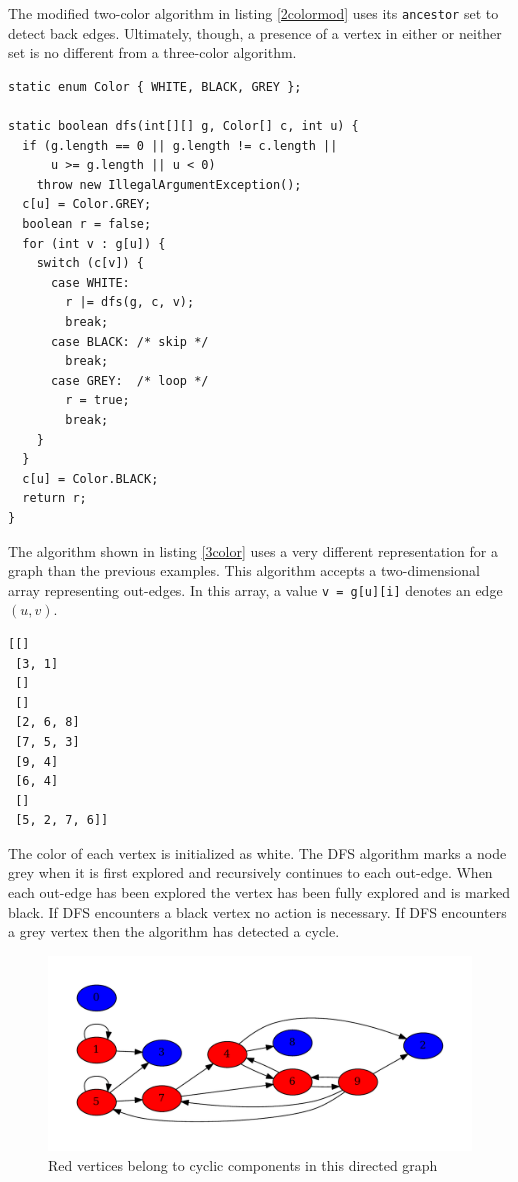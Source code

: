 \documentclass{book}
\begin{document}
The modified two-color algorithm in listing \ref{2colormod} uses its \texttt{ancestor} set to detect back edges. Ultimately, though, a presence of a vertex in either or neither set is no different from a three-color algorithm.

\begin{lstlisting}[columns=fixed,caption={DFS algorithm with three colors},label={3color}]
static enum Color { WHITE, BLACK, GREY };

static boolean dfs(int[][] g, Color[] c, int u) {
  if (g.length == 0 || g.length != c.length ||
      u >= g.length || u < 0)
    throw new IllegalArgumentException();
  c[u] = Color.GREY;
  boolean r = false;
  for (int v : g[u]) {
    switch (c[v]) {
      case WHITE:
      	r |= dfs(g, c, v);
      	break;
      case BLACK: /* skip */
      	break;
      case GREY:  /* loop */
      	r = true;
      	break;
    }
  }
  c[u] = Color.BLACK;
  return r;
}
\end{lstlisting}

The algorithm shown in listing \ref{3color} uses a very different representation for a graph than the previous examples. This algorithm accepts a two-dimensional array representing out-edges. In this array, a value \texttt{v = g[u][i]} denotes an edge $(u,v)$.

\begin{lstlisting}[caption={A two-dimensional array representing the graph shown in figure \ref{redblue}}]
[[]
 [3, 1]
 []
 []
 [2, 6, 8]
 [7, 5, 3]
 [9, 4]
 [6, 4]
 []
 [5, 2, 7, 6]]
 \end{lstlisting}

The color of each vertex is initialized as white. The DFS algorithm marks a node grey when it is first explored and recursively continues to each out-edge. When each out-edge has been explored the vertex has been fully explored and is marked black. If DFS encounters a black vertex no action is necessary. If DFS encounters a grey vertex then the algorithm has detected a cycle.

\begin{figure}
\centering
\includegraphics[width=\columnwidth]{ch-dag/redblue}
\caption{Red vertices belong to cyclic components in this directed graph}
\label{redblue}
\end{figure}
\end{document}
